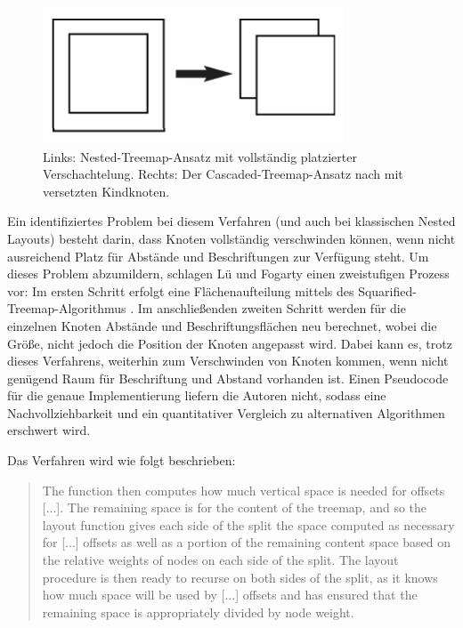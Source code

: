 \begin{figure}
    \centering
    \includegraphics[width=0.8\textwidth]{images/cascaded.png}
    \caption{Links: Nested-Treemap-Ansatz mit vollständig platzierter Verschachtelung. Rechts: Der Cascaded-Treemap-Ansatz nach \cite[3]{lu2008cascaded} mit versetzten Kindknoten.}
    \label{fig:cascaded}
\end{figure}

Ein identifiziertes Problem bei diesem Verfahren (und auch bei klassischen Nested Layouts) besteht darin, dass Knoten vollständig verschwinden können, wenn nicht ausreichend Platz für Abstände und Beschriftungen zur Verfügung steht. Um dieses Problem abzumildern, schlagen Lü und Fogarty einen zweistufigen Prozess vor: Im ersten Schritt erfolgt eine Flächenaufteilung mittels des Squarified-Treemap-Algorithmus \cite{bruls2000squarified}. Im anschließenden zweiten Schritt werden für die einzelnen Knoten Abstände und Beschriftungsflächen neu berechnet, wobei die Größe, nicht jedoch die Position der Knoten angepasst wird. Dabei kann es, trotz dieses Verfahrens, weiterhin zum Verschwinden von Knoten kommen, wenn nicht genügend Raum für Beschriftung und Abstand vorhanden ist. Einen Pseudocode für die genaue Implementierung liefern die Autoren nicht, sodass eine Nachvollziehbarkeit und ein quantitativer Vergleich zu alternativen Algorithmen erschwert wird.

Das Verfahren wird wie folgt beschrieben:
\begin{quote}
    The function then computes how much vertical space is needed for offsets [...]. The remaining space is for the content of the treemap, and so the layout function gives each side of the split the space computed as necessary for [...] offsets as well as a portion of the remaining content space based on the relative weights of nodes on each side of the split. The layout procedure is then ready to recurse on both sides of the split, as it knows how much space will be used by [...] offsets and has ensured that the remaining space is appropriately divided by node weight. \cite[6]{lu2008cascaded}
\end{quote}

